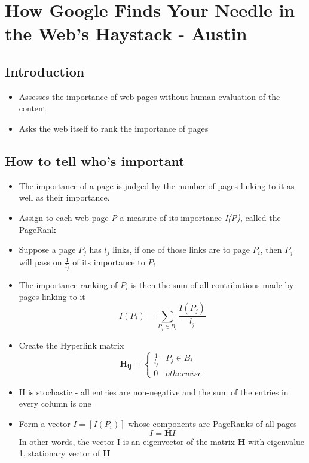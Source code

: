 \documentclass[11pt]{report}
\begin{document}
\chapter{How Google Finds Your Needle in the Web's Haystack - Austin}
\section{Introduction}
\begin{itemize}
\item Assesses the importance of web pages without human evaluation of the content
\item Asks the web itself to rank the importance of pages
\end{itemize}
\section{How to tell who's important}
\begin{itemize}
\item The importance of a page is judged by the number of pages linking to it as well as their importance.
\item Assign to each web page \textit{P} a measure of its importance \textit{I(P)}, called the PageRank
\item Suppose a page $P_j$ has $l_j$ links, if one of those links are to page $P_i$, then $P_j$ will pass on $\frac{1}{l_j}$ of its importance to $P_i$
\item The importance ranking of $P_i$ is then the sum of all contributions made by pages linking to it
\begin{equation}
I(P_i) = \displaystyle \sum_{P_j\in B_{i}} \frac{I(P_j)}{l_j}
\end{equation}
\item Create the Hyperlink matrix
\begin{equation}
\boldsymbol{H_{ij}} = \begin{cases} \frac{1}{l_j} & P_j\in B_{i} \\ 0 & otherwise\end{cases}
\end{equation}
\item H is stochastic - all entries are non-negative and the sum of the entries in every column is one
\item Form a vector $I=[I(P_i)]$ whose components are PageRanks of all pages \begin{equation}
I=\textbf{H}I 
\end{equation} In other words, the vector I is an eigenvector of the matrix \textbf{H} with eigenvalue 1, stationary vector of \textbf{H}
\end{itemize}
\end{document}
